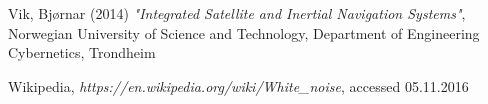 \documentclass{article}
\begin{document}
\newpage
{}
\begin{thebibliography}{25}

	Vik, Bjørnar (2014)
	\emph{"Integrated Satellite and Inertial Navigation Systems"},
	Norwegian University of Science and Technology, Department of Engineering Cybernetics, Trondheim
	
	Wikipedia,
	\emph{https://en.wikipedia.org/wiki/White\_noise},
	accessed 05.11.2016
	
\end{thebibliography}
\end{document}
